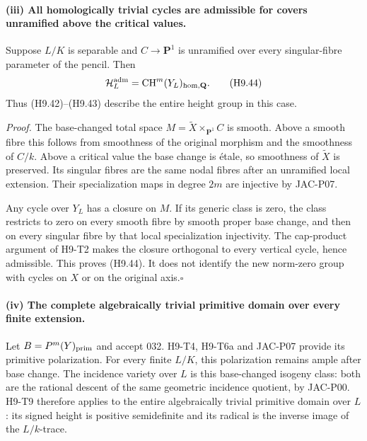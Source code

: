 \documentclass[11pt,a4paper]{article}
\begin{document}
\paragraph{(iii) All homologically trivial cycles are admissible for covers unramified above the critical values.}
Suppose $L/K$ is separable and $C\to\mathbf P^1$ is unramified over
every singular-fibre parameter of the pencil. Then
\[
 \mathcal H_L^{\rm adm}
       =\operatorname{CH}^m(Y_L)_{\rm hom,\mathbf Q}.          \tag{H9.44}
\]
Thus (H9.42)--(H9.43) describe the entire height group in this case.

\emph{Proof.} The base-changed total space
$M=\widetilde X\times_{\mathbf P^1}C$ is smooth. Above a smooth
fibre this follows from smoothness of the original morphism and the
smoothness of $C/k$. Above a critical value the base change is \'etale,
so smoothness of $\widetilde X$ is preserved. Its singular fibres are
the same nodal fibres after an unramified local extension. Their
specialization maps in degree $2m$ are injective by JAC-P07.

Any cycle over $Y_L$ has a closure on $M$. If its generic class is zero,
the class restricts to zero on every smooth fibre by smooth proper base
change, and then on every singular fibre by that local specialization
injectivity. The cap-product argument of H9-T2 makes the closure
orthogonal to every vertical cycle, hence admissible. This proves
(H9.44). It does not identify the new norm-zero group with cycles on
$X$ or on the original axis.\hfill$\square$

\paragraph{(iv) The complete algebraically trivial primitive domain over every finite extension.}
Let $B=P^m(Y)_{\rm prim}$ and accept 032. H9-T4, H9-T6a and JAC-P07
provide its primitive polarization. For every finite $L/K$, this
polarization remains ample after base change. The incidence variety
over $L$ is this base-changed isogeny class: both are the rational
descent of the same geometric incidence quotient, by JAC-P00.
H9-T9 therefore applies
to the entire algebraically trivial primitive domain over $L$: its
signed height is positive semidefinite and its radical is the inverse
image of the $L/k$-trace.
\end{document}
